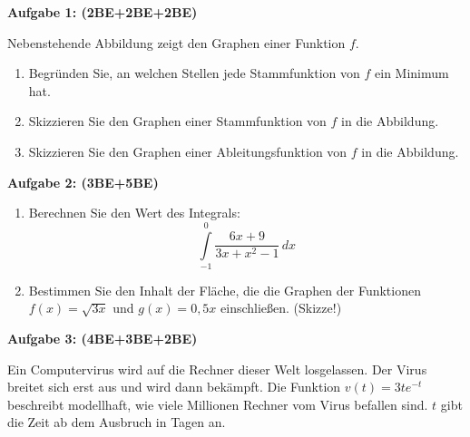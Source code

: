 \documentclass[a4paper,12pt]{article}
\newcommand{\Aufgabe}[1]{
  {
  \vspace*{0.5cm}
  \textsf{\textbf{Aufgabe #1}}
  \vspace*{0.2cm}
  
  }
}
\begin{document}
\vspace{5cm}

\newpage

\Aufgabe{1: (2BE+2BE+2BE)} 

Nebenstehende Abbildung zeigt den Graphen einer Funktion $f$.
  \begin{enumerate}[label={\alph*)}] 
    \item Begründen Sie, an welchen Stellen jede Stammfunktion von $f$ ein Minimum hat.
    \item Skizzieren Sie den Graphen einer Stammfunktion von $f$ in die Abbildung.
    \item Skizzieren Sie den Graphen einer Ableitungsfunktion von $f$ in die Abbildung.
  \end{enumerate}

\begin{center}
\end{center}

\vspace{2cm}

\Aufgabe{2: (3BE+5BE)} 
\begin{enumerate}[label={\alph*)}] 
  \item Berechnen Sie den Wert des Integrals:
    \[ \int\limits_{-1}^{0}\frac{6x+9}{3x+x^2-1}\,dx \]
  \item Bestimmen Sie den Inhalt der Fläche, die die Graphen der Funktionen ${f(x)=\sqrt{3x}}$ und $g(x) = 0,5x$ einschließen. (Skizze!)
\end{enumerate}

\Aufgabe{3: (4BE+3BE+2BE)} 
Ein Computervirus wird auf die Rechner dieser Welt losgelassen. Der Virus breitet sich erst aus und wird dann bekämpft. Die Funktion $v(t)=3t e^{-t}$  beschreibt modellhaft, wie viele Millionen Rechner vom Virus befallen sind. $t$ gibt die Zeit ab dem Ausbruch in Tagen an.
\end{document}
